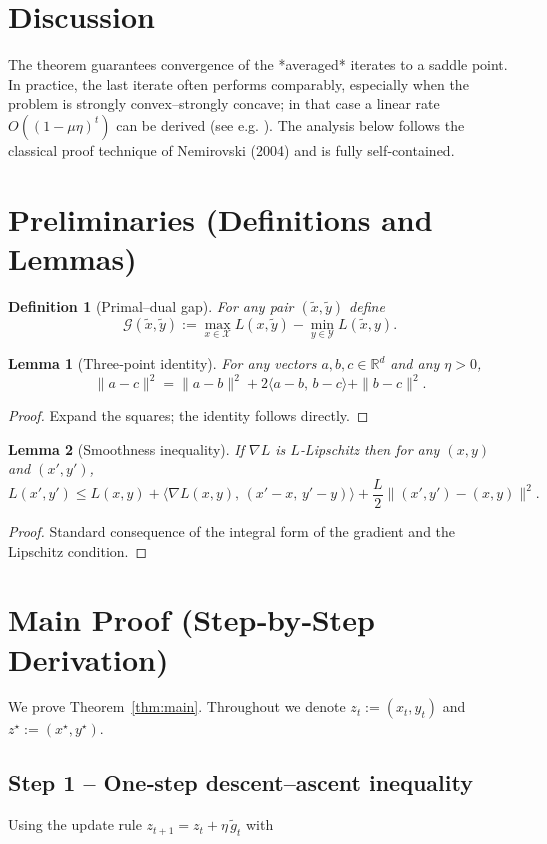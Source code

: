 \documentclass{article}
\newtheorem{lemma}{Lemma}
\newtheorem{definition}{Definition}
\newcommand{\R}{\mathbb{R}}
\begin{document}
\section*{Discussion}
The theorem guarantees convergence of the *averaged* iterates to a saddle point. In practice, the last iterate often performs comparably, especially when the problem is strongly convex–strongly concave; in that case a linear rate $O((1-\mu\eta)^{t})$ can be derived (see e.g. \cite{nemirovski2004prox}). The analysis below follows the classical proof technique of Nemirovski (2004) and is fully self‑contained.

\section*{Preliminaries (Definitions and Lemmas)}
\begin{definition}[Primal–dual gap]
For any pair $(\tilde x,\tilde y)$ define 
\[
\mathcal{G}(\tilde x,\tilde y):=
\max_{x\in\mathcal{X}}L(x,\tilde y)-\min_{y\in\mathcal{Y}}L(\tilde x,y).
\]
\end{definition}
\begin{lemma}[Three‑point identity]\label{lem:three}
For any vectors $a,b,c\in\R^{d}$ and any $\eta>0$,
\[
\|a-c\|^{2}= \|a-b\|^{2}+2\langle a-b,\,b-c\rangle+\|b-c\|^{2}.
\]
\end{lemma}
\begin{proof}
Expand the squares; the identity follows directly. \qedhere
\end{proof}
\begin{lemma}[Smoothness inequality]\label{lem:smooth}
If $\nabla L$ is $L$‑Lipschitz then for any $(x,y)$ and $(x',y')$,
\[
L(x',y')\le L(x,y)+\langle\nabla L(x,y),\,(x'-x,\,y'-y)\rangle
+\frac{L}{2}\|(x',y')-(x,y)\|^{2}.
\]
\end{lemma}
\begin{proof}
Standard consequence of the integral form of the gradient and the Lipschitz condition. \qedhere
\end{proof}

\section*{Main Proof (Step‑by‑Step Derivation)}
We prove Theorem~\ref{thm:main}. Throughout we denote $z_{t}:=(x_{t},y_{t})$ and $z^{\star}:=(x^{\star},y^{\star})$.

\subsection*{Step 1 – One‑step descent–ascent inequality}
Using the update rule $z_{t+1}=z_{t}+ \eta\,\tilde g_{t}$ with  
\end{document}
